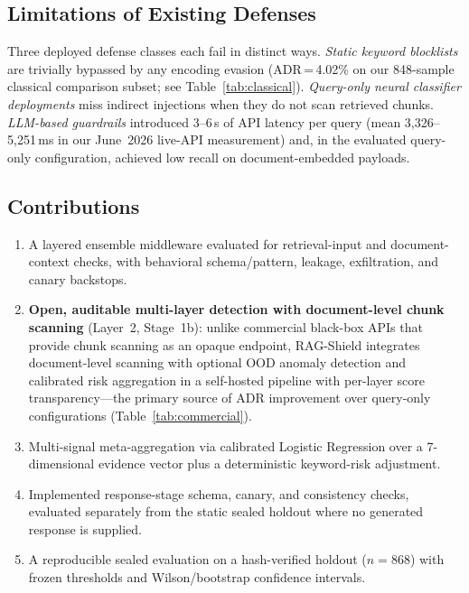 ﻿\documentclass[conference]{IEEEtran}
\begin{document}
\subsection{Limitations of Existing Defenses}

Three deployed defense classes each fail in distinct ways.
\textit{Static keyword blocklists} are trivially bypassed by any encoding
evasion (ADR\,=\,4.02\% on our 848-sample classical comparison subset;
see Table~\ref{tab:classical}).
\textit{Query-only neural classifier deployments} miss indirect injections
when they do not scan retrieved chunks.
\textit{LLM-based guardrails} introduced 3--6\,s of API latency per query
(mean 3,326--5,251\,ms in our June~2026 live-API measurement) and, in the
evaluated query-only configuration, achieved low recall on document-embedded
payloads.

\subsection{Contributions}

\begin{enumerate}
  \item A layered ensemble middleware evaluated for retrieval-input and
    document-context checks, with behavioral schema/pattern, leakage,
    exfiltration, and canary backstops.
  \item \textbf{Open, auditable multi-layer detection with document-level
    chunk scanning} (Layer~2, Stage~1b): unlike commercial black-box APIs
    that provide chunk scanning as an opaque endpoint, RAG-Shield integrates
    document-level scanning with optional OOD anomaly detection and calibrated risk
    aggregation in a self-hosted pipeline with per-layer score
    transparency---the primary source of ADR improvement over query-only
    configurations (Table~\ref{tab:commercial}).
  \item Multi-signal meta-aggregation via calibrated Logistic Regression over
    a 7-dimensional evidence vector plus a deterministic keyword-risk
    adjustment.
  \item Implemented response-stage schema, canary, and consistency checks,
    evaluated separately from the static sealed holdout where no generated
    response is supplied.
  \item A reproducible sealed evaluation on a hash-verified holdout
    ($n = 868$) with frozen thresholds and Wilson/bootstrap confidence
    intervals.
\end{enumerate}
\end{document}
